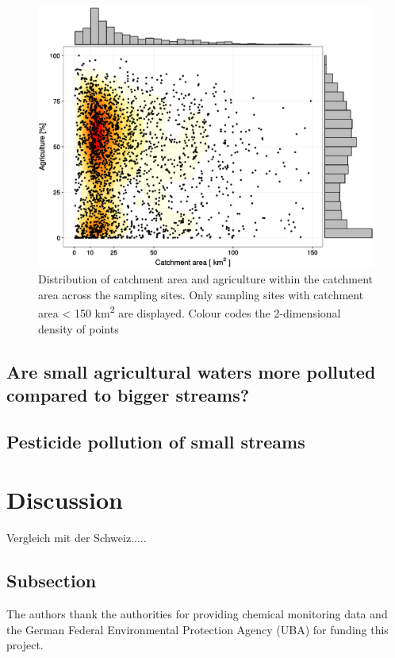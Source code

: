 \documentclass[journal=esthag,manuscript=article]{achemso}
\begin{document}
\begin{figure}
  \includegraphics[width=.8\textwidth]{fig/ezg_lu.pdf}
  \caption{Distribution of catchment area and agriculture within the catchment area across the sampling sites.
  Only sampling sites with catchment area < 150 km\textsuperscript{2} are displayed. 
  Colour codes the 2-dimensional density of points
  }
  \label{fig:fig_ezg_lu}
\end{figure}


\subsection{Are small agricultural waters more polluted compared to bigger streams?}




\subsection{Pesticide pollution of small streams}




\section{Discussion}

Vergleich mit der Schweiz.....

\subsection{Subsection}






\begin{acknowledgement}
The authors thank the authorities for providing chemical monitoring data and the German Federal Environmental Protection Agency (UBA) for funding this project.
\end{acknowledgement}
\end{document}
